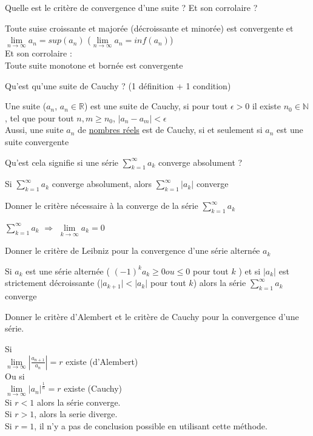 \documentclass[12pt]{article}
\newcommand*{\xfield}[1]{\begin{mdframed}\centering #1\end{mdframed}\bigskip}
\newenvironment{note}{}{}
\begin{document}
\begin{note}
    \xfield{Quelle est le critère de convergence d'une suite ? Et son corrolaire ?}
    \xfield{
        Toute suise croissante et majorée (décroissante et minorée) est convergente et $\lim\limits_{n \to \infty} a_n = sup(a_n)$ ($\lim\limits_{n \to \infty} a_n = inf(a_n)$) \\
        Et son corrolaire : \\
        Toute suite monotone et bornée est convergente
    }
\end{note}

\begin{note}
    \xfield{Qu'est qu'une suite de Cauchy ? (1 définition + 1 condition)}
    \xfield{
        Une suite ($a_n$, $a_n \in \mathbb{R}$) est une suite de Cauchy, si pour tout $\epsilon > 0$ il existe $n_0 \in \mathbb{N}$, tel que pour tout $n,m \ge n_0$, $ | a_n - a_m | < \epsilon$\\
        Aussi, une suite $a_n$ de \underline{nombres réels} est de Cauchy, si et seulement si $a_n$ est une suite convergente
    }
\end{note}

\begin{note}
	\xfield{Qu'est cela signifie si une série $\sum\limits^{\infty}_{k=1} a_k$ converge absolument ?}
	\xfield{Si $\sum\limits^{\infty}_{k=1} a_k$ converge absolument, alors $\sum\limits^{\infty}_{k=1} \vert a_k\vert$ converge }
\end{note}

\begin{note}
	\xfield{Donner le critère nécessaire à la converge de la série $\sum\limits^{\infty}_{k=1} a_k$}
	\xfield{$\sum\limits^{\infty}_{k=1} a_k$ $\Rightarrow$ $\lim\limits_{k\to \infty}a_k = 0$}
\end{note}

\begin{note}
	\xfield{Donner le critère de Leibniz pour la convergence d'une série alternée $a_k$}
	\xfield{Si $a_k$ est une série alternée ( $(-1)^k a_k \ge 0 ou \le 0$ pour tout $k$ ) et si $\vert a_k \vert$ est strictement décroissante ($\vert a_{k+1} \vert < \vert a_k \vert$ pour tout $k$) alors la série $\sum\limits^{\infty}_{k=1} a_k$ converge}
\end{note}

\begin{note}
    \xfield{Donner le critère d'Alembert et le critère de Cauchy pour la convergence d'une série.}
    \xfield{
        Si\\
        $\lim\limits_{n \to \infty} \left|\frac{a_{n+1}}{a_n}\right| = r$ existe (d'Alembert)\\
        Ou si\\
        $\lim\limits_{n \to \infty} \left|a_n\right|^{\frac{1}{n}} = r$ existe (Cauchy)\\
        Si $r < 1$ alors la série converge.\\
	Si $r > 1$, alors la serie diverge.\\
	Si $r = 1$, il n'y a pas de conclusion possible en utilisant cette méthode.
    }
\end{note}
\end{document}
